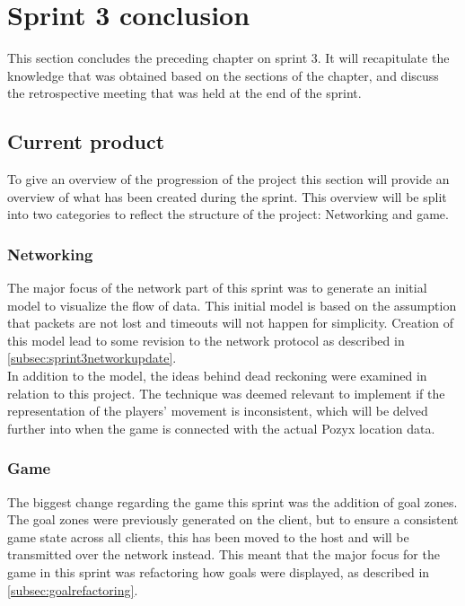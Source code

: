\section{Sprint 3 conclusion}\label{sec:sprint3conclusion}
This section concludes the preceding chapter on sprint 3.
It will recapitulate the knowledge that was obtained based on the sections of the chapter, and discuss the retrospective meeting that was held at the end of the sprint.

\subsection{Current product}
To give an overview of the progression of the project this section will provide an overview of what has been created during the sprint.
This overview will be split into two categories to reflect the structure of the project: Networking and game.

\subsubsection{Networking}
The major focus of the network part of this sprint was to generate an initial \uppaal model to visualize the flow of data.
This initial model is based on the assumption that packets are not lost and timeouts will not happen for simplicity.
Creation of this model lead to some revision to the network protocol as described in \autoref{subsec:sprint3networkupdate}.\\
In addition to the \uppaal model, the ideas behind dead reckoning were examined in relation to this project.
The technique was deemed relevant to implement if the representation of the players' movement is inconsistent, which will be delved further into when the game is connected with the actual Pozyx location data.

\subsubsection{Game}
The biggest change regarding the game this sprint was the addition of goal zones.
The goal zones were previously generated on the client, but to ensure a consistent game state across all clients, this has been moved to the host and will be transmitted over the network instead.
This meant that the major focus for the game in this sprint was refactoring how goals were displayed, as described in \autoref{subsec:goalrefactoring}.

